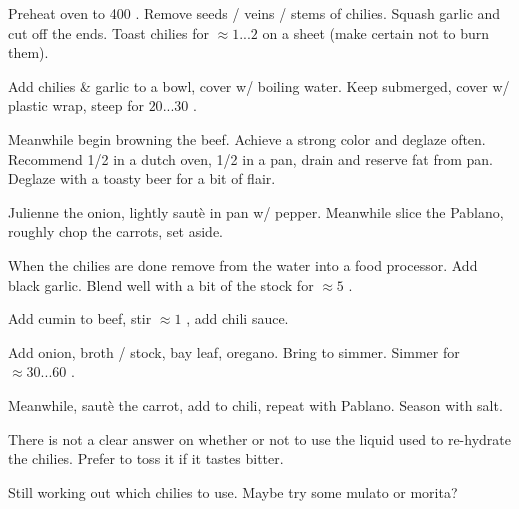 \begin{preparation}
\item Preheat oven to 400 \Fahrenheit.
	Remove seeds / veins / stems of chilies.
	Squash garlic and cut off the ends.
	Toast chilies for $\approx 1...2$ on a sheet (make certain not to burn them).

\item Add chilies \& garlic to a bowl, cover w/ boiling water.
	Keep submerged, cover w/ plastic wrap, steep for $20...30$ \minute.

\item Meanwhile begin browning the beef.
	Achieve a strong color and deglaze often.
	Recommend 1/2 in a dutch oven, 1/2 in a pan, drain and reserve fat from pan.
	Deglaze with a toasty beer for a bit of flair.

\item Julienne the onion, lightly saut\`{e} in pan w/ pepper.
	Meanwhile slice the Pablano, roughly chop the carrots, set aside.

\item When the chilies are done remove from the water into a food processor.
	Add black garlic.
	Blend well with a bit of the stock for $\approx5$ \minute.

\item Add cumin to beef, stir $\approx 1$ \minute, add chili sauce.

\item Add onion, broth / stock, bay leaf, oregano.
	Bring to simmer.
	Simmer for $\approx30...60$ \minute.

\item Meanwhile, saut\`{e} the carrot, add to chili, repeat with Pablano.
	Season with salt.
\end{preparation}


\begin{variation}
\item There is not a clear answer on whether or not to use the liquid used to re-hydrate the chilies.
	Prefer to toss it if it tastes bitter.
\end{variation}


\begin{experiments}
\item Still working out which chilies to use.
	Maybe try some mulato or morita?
\end{experiments}


\recipeend
